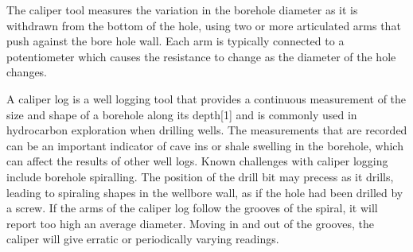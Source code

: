 \begin{enumerate}
\vspace{1em}

The caliper tool measures the variation in the borehole diameter as it
is withdrawn from the bottom of the hole, using two or more
articulated arms that push against the bore hole wall. Each arm is
typically connected to a potentiometer which causes the resistance to
change as the diameter of the hole changes.

\vspace{1em}

A caliper log is a well logging tool that provides a continuous measurement of the size and 
shape of a borehole along its depth[1] and is commonly used in hydrocarbon exploration when 
drilling wells. The measurements that are recorded can be an important indicator of cave ins or 
shale swelling in the borehole, which can affect the results of other well logs. Known challenges with 
caliper logging include borehole spiralling. The position of the drill bit may precess as it drills, 
leading to spiraling shapes in the wellbore wall, as if the hole had been drilled by a screw. 
If the arms of the caliper log follow the grooves of the spiral, it will report too high an average diameter.
Moving in and out of the grooves, the caliper will give erratic or periodically varying readings. 


\end{enumerate}


 
